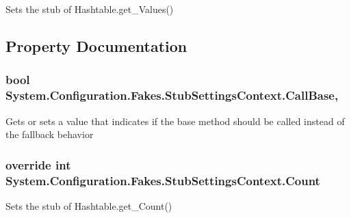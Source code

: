 Sets the stub of Hashtable.\-get\-\_\-\-Values()



\subsection{Property Documentation}
\hypertarget{class_system_1_1_configuration_1_1_fakes_1_1_stub_settings_context_ac03a459f4fec5c560b977a6cabf5abb7}{
\subsubsection[{Call\-Base}]{\setlength{\rightskip}{0pt plus 5cm}bool System.\-Configuration.\-Fakes.\-Stub\-Settings\-Context.\-Call\-Base\hspace{0.3cm}{\ttfamily [get]}, {\ttfamily [set]}}}\label{class_system_1_1_configuration_1_1_fakes_1_1_stub_settings_context_ac03a459f4fec5c560b977a6cabf5abb7}


Gets or sets a value that indicates if the base method should be called instead of the fallback behavior

\hypertarget{class_system_1_1_configuration_1_1_fakes_1_1_stub_settings_context_aca1430c1a7bfcceaa2e5b3b070f8b7d8}{
\subsubsection[{Count}]{\setlength{\rightskip}{0pt plus 5cm}override int System.\-Configuration.\-Fakes.\-Stub\-Settings\-Context.\-Count\hspace{0.3cm}{\ttfamily [get]}}}\label{class_system_1_1_configuration_1_1_fakes_1_1_stub_settings_context_aca1430c1a7bfcceaa2e5b3b070f8b7d8}


Sets the stub of Hashtable.\-get\-\_\-\-Count()


